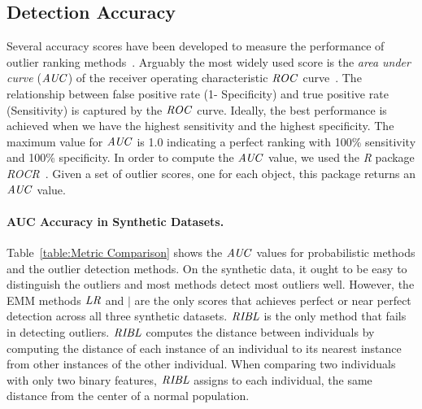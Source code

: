 {\subsection{Detection Accuracy} \label{sec:detection} Several accuracy scores have been developed to measure the performance of outlier ranking methods~\citep{aggarwal2013}. Arguably the most widely used score is the {\em area under curve} ($\it{AUC}$) of the receiver operating characteristic $\it{ROC}$ curve~\citep{Fawcett2006,Cansado2008,Muller2012}. 
		The relationship between false positive rate (1- Specificity) and true positive rate (Sensitivity) is captured by the $\it{ROC}$ curve. Ideally, the best performance is achieved when we have the highest sensitivity and the highest specificity. 
		The maximum value for $\it{AUC}$ is 1.0 indicating a perfect ranking with 100\% sensitivity and 100\% specificity. In order to compute the $\it{AUC}$ value, we used the \textit{R} package \textit{ROCR}~\citep{RROCR2012}. Given a set of outlier scores, one for each object, this package returns an $\it{AUC}$ value. 



	\paragraph{AUC Accuracy in Synthetic Datasets.}
	Table~\ref{table:Metric Comparison} shows the $\it{AUC}$ values for probabilistic methods and the outlier detection methods. On the synthetic data, it ought to be easy to distinguish the outliers and most methods detect most outliers well.  However, the EMM methods $\it{LR}$ and $\mid$ are the only scores that achieves perfect or near perfect detection across all three synthetic datasets. $\it{RIBL}$ is the only method that fails in detecting outliers. $\it{RIBL}$ computes the distance between individuals by computing the distance of each instance of an individual to its nearest instance from other instances of the other individual. When comparing two individuals with only two binary features, $\it{RIBL}$ assigns to each individual, the same distance from the center of a normal population.
	
}
